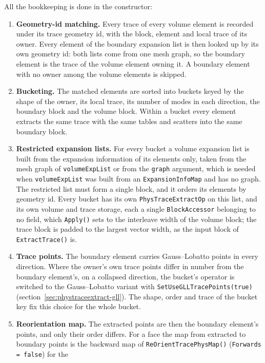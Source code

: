 All the bookkeeping is done in the constructor:
\begin{enumerate}
  \item \textbf{Geometry-id matching.} Every trace of every volume element
    is recorded under its trace geometry id, with the block, element and
    local trace of its owner. Every element of the boundary expansion list
    is then looked up by its own geometry id: both lists come from one mesh
    graph, so the boundary element is the trace of the volume element
    owning it. A boundary element with no owner among the volume elements
    is skipped.
  \item \textbf{Bucketing.} The matched elements are sorted into buckets
    keyed by the shape of the owner, its local trace, its number of modes
    in each direction, the boundary block and the volume block. Within a
    bucket every element extracts the same trace with the same tables and
    scatters into the same boundary block.
  \item \textbf{Restricted expansion lists.} For every bucket a volume
    expansion list is built from the expansion information of its elements
    only, taken from the mesh graph of \texttt{volumeExpList} or from the
    \texttt{graph} argument, which is needed when \texttt{volumeExpList}
    was built from an \texttt{ExpansionInfoMap} and has no graph. The
    restricted list must form a single block, and it orders its elements by
    geometry id. Every bucket has its own \texttt{PhysTraceExtractOp} on
    this list, and its own volume and trace storage, each a single
    \texttt{BlockAccessor} belonging to no field, which \texttt{Apply()}
    sets to the interleave width of the volume block; the trace block is
    padded to the largest vector width, as the input block of
    \texttt{ExtractTrace()} is.
  \item \textbf{Trace points.} The boundary element carries Gauss--Lobatto
    points in every direction. Where the owner's own trace points differ
    in number from the boundary element's, on a collapsed direction, the
    bucket's operator is switched to the Gauss--Lobatto variant with
    \texttt{SetUseGLLTracePoints(true)}
    (section~\ref{sec:phystraceextract-gll}). The shape, order and trace
    of the bucket key fix this choice for the whole bucket.
  \item \textbf{Reorientation map.} The extracted points are then the
    boundary element's points, and only their order differs. For a face the
    map from extracted to boundary points is the backward map of
    \texttt{ReOrientTracePhysMap()} (\texttt{Forwards = false}) for the

\end{enumerate}
